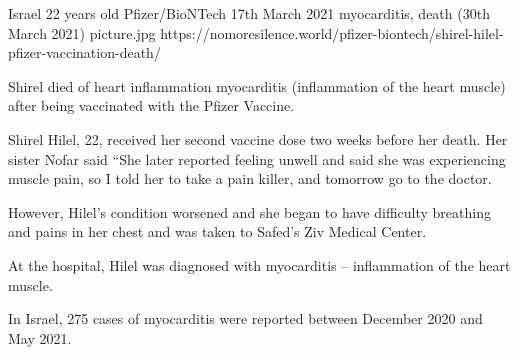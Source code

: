{Israel}
{22 years old}
{Pfizer/BioNTech}
{17th March 2021}
{myocarditis, death (30th March 2021)}
{picture.jpg}
{https://nomoresilence.world/pfizer-biontech/shirel-hilel-pfizer-vaccination-death/}
{

Shirel died of heart inflammation myocarditis (inflammation of the heart muscle)
after being vaccinated with the Pfizer Vaccine.

Shirel Hilel, 22, received her second vaccine dose two weeks before her
death. Her sister Nofar said “She later reported feeling unwell and said she was
experiencing muscle pain, so I told her to take a pain killer, and tomorrow go
to the doctor.

However, Hilel’s condition worsened and she began to have difficulty breathing
and pains in her chest and was taken to Safed’s Ziv Medical Center.

At the hospital, Hilel was diagnosed with myocarditis – inflammation of the
heart muscle.

In Israel, 275 cases of myocarditis were reported between December 2020 and May
2021.

}
